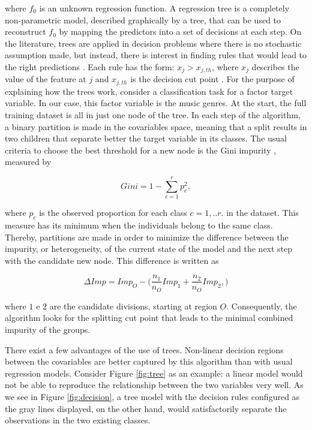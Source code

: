 \documentclass[twocolumn]{article}
\begin{document}
where $f_0$ is an unknown regression function. 
A regression tree is a completely non-parametric model,
described graphically by a tree,
that can be used to reconstruct $f_0$ by mapping the
predictors into a set of decisions at each step. 
On the literature, trees are applied in decision problems where there is no stochastic assumption made,
but instead, there is interest in finding 
rules that would lead to the right predictions \cite{Faraway2016}. 
Each rule has the form: $x_j > x_{j,th}$,
where $ x_j$ describes the value of the feature at $j$ and $ x_{j,th}$ is the decision cut point
\cite{Kingsford2008}. 
For the purpose of explaining how the trees work, consider a classification task for a factor target variable.  In our case, this factor variable is
the music genres. At the start, the full training dataset is
all in just one node of the tree. In each step of the algorithm, a binary partition is made in the covariables
space, meaning that a split results in two children that
separate better the target variable in its classes. The 
usual criteria to choose the best threshold for a new node is the Gini impurity \cite{Hastie}, measured by

\begin{equation}
Gini = 1 - \sum_{c = 1}^{r} p_c^{2},   
\end{equation}

where $p_c$ is the observed proportion for each class $c = 1,..r.$ in the dataset. This measure has its minimum when the individuals belong to the same class. Thereby, 
partitions are made in order to minimize the difference between the impurity, or heterogeneity, of the current state of the model and the next step with the candidate new node. This difference is written as

\begin{equation}
\Delta Imp = Imp_{O} - \Big( \frac{n_1}{n_{O}}
Imp_{1} + \frac{n_2}{n_{O}} Imp_{2},
\Big)
\end{equation}

where $1$ e $2$ are the candidate divisions, starting at region $O$. Consequently, 
the algorithm looks for the splitting
cut point that leads to the minimal
combined impurity of the groups. 

There exist a few advantages of the use of trees. 
Non-linear decision regions between the covariables are
better captured by this algorithm than with usual 
regression models. Consider Figure \ref{fig:tree} 
as an example: a linear model would not be able
to reproduce the relationship between the two 
variables very well. As we see in Figure
\ref{fig:decision}, a tree model with the 
decision rules configured as the gray lines 
displayed, on the other hand,
would satisfactorily separate 
the observations in the two existing classes. 
\end{document}
